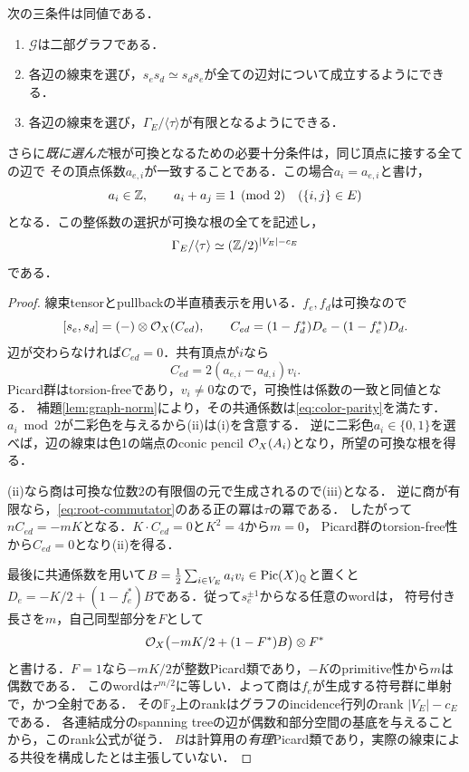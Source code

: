 \begin{theorem}[二部性による可換な根の選択]\label{thm:bipartite-roots}
次の三条件は同値である．
\begin{enumerate}
\item $\mathcal G$は二部グラフである．
\item 各辺の線束を選び，$s_es_d\simeq s_ds_e$が全ての辺対について成立するようにできる．
\item 各辺の線束を選び，$\Gamma_E/\langle\tau\rangle$が有限となるようにできる．
\end{enumerate}
さらに\emph{既に選んだ}根が可換となるための必要十分条件は，同じ頂点に接する全ての辺で
その頂点係数$a_{e,i}$が一致することである．この場合$a_i=a_{e,i}$と書け，
\begin{equation}\label{eq:color-parity}
 a_i\in\mathbb Z,\qquad a_i+a_j\equiv1\pmod2\quad(\{i,j\}\in E)
\end{equation}
となる．この整係数の選択が可換な根の全てを記述し，
\[
 \Gamma_E/\langle\tau\rangle\simeq(\mathbb Z/2)^{|V_E|-c_E}
\]
である．
\end{theorem}
\begin{proof}
線束tensorとpullbackの半直積表示を用いる．$f_e,f_d$は可換なので
\begin{equation}\label{eq:root-commutator}
 [s_e,s_d]=(-)\otimes\mathcal O_X(C_{ed}),\qquad
 C_{ed}=(1-f_d^*)D_e-(1-f_e^*)D_d.
\end{equation}
辺が交わらなければ$C_{ed}=0$．共有頂点が$i$なら
\[
 C_{ed}=2(a_{e,i}-a_{d,i})v_i.
\]
Picard群はtorsion-freeであり，$v_i\ne0$なので，可換性は係数の一致と同値となる．
補題\ref{lem:graph-norm}により，その共通係数は\eqref{eq:color-parity}を満たす．
$a_i\bmod2$が二彩色を与えるから(ii)は(i)を含意する．
逆に二彩色$a_i\in\{0,1\}$を選べば，辺の線束は色1の端点のconic pencil
$\mathcal O_X(A_i)$となり，所望の可換な根を得る．

(ii)なら商は可換な位数2の有限個の元で生成されるので(iii)となる．
逆に商が有限なら，\eqref{eq:root-commutator}のある正の冪は$\tau$の冪である．
したがって$nC_{ed}=-mK$となる．$K\cdot C_{ed}=0$と$K^2=4$から$m=0$，
Picard群のtorsion-free性から$C_{ed}=0$となり(ii)を得る．

最後に共通係数を用いて$B=\tfrac12\sum_{i\in V_E}a_i v_i\in\operatorname{Pic}(X)_\mathbb Q$と置くと
$D_e=-K/2+(1-f_e^*)B$である．従って$s_e^{\pm1}$からなる任意のwordは，
符号付き長さを$m$，自己同型部分を$F$として
\[
 \mathcal O_X\bigl(-mK/2+(1-F^*)B\bigr)\otimes F^*
\]
と書ける．$F=1$なら$-mK/2$が整数Picard類であり，$-K$のprimitive性から$m$は偶数である．
このwordは$\tau^{m/2}$に等しい．よって商は$f_e$が生成する符号群に単射で，かつ全射である．
その$\mathbb F_2$上のrankはグラフのincidence行列のrank $|V_E|-c_E$である．
各連結成分のspanning treeの辺が偶数和部分空間の基底を与えることから，このrank公式が従う．
$B$は計算用の\emph{有理}Picard類であり，実際の線束による共役を構成したとは主張していない．
\end{proof}

